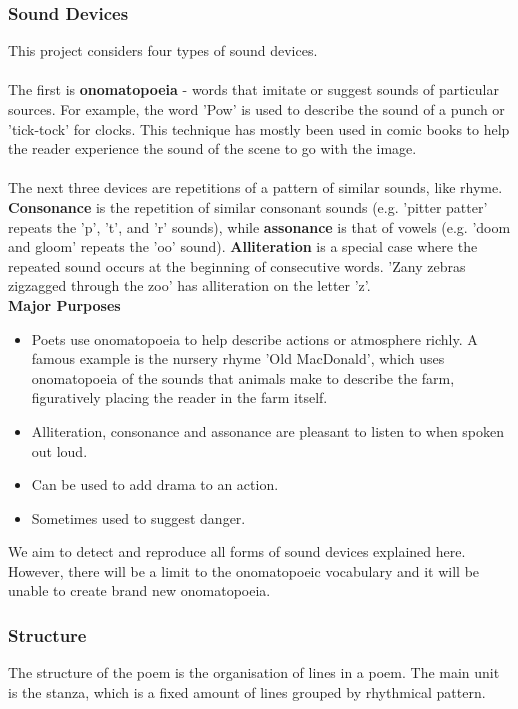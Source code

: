 \subsubsection{Sound Devices}
This project considers four types of sound devices.
\\\\
The first is \textbf{onomatopoeia} - words that imitate or suggest sounds of particular sources. For example, the word 'Pow' is used to describe the sound of a punch or 'tick-tock' for clocks. This technique has mostly been used in comic books to help the reader experience the sound of the scene to go with the image.
\\\\
The next three devices are repetitions of a pattern of similar sounds, like rhyme. \textbf{Consonance} is the repetition of similar consonant sounds (e.g. 'pitter patter' repeats the 'p', 't', and 'r' sounds), while \textbf{assonance} is that of vowels (e.g. 'doom and gloom' repeats the 'oo' sound). \textbf{Alliteration} is a special case where the repeated sound occurs at the beginning of consecutive words. 'Zany zebras zigzagged through the zoo' has alliteration on the letter 'z'.
\\
\textbf{Major Purposes}
\begin{itemize}
\item{Poets use onomatopoeia to help describe actions or atmosphere richly. A famous example is the nursery rhyme 'Old MacDonald', which uses onomatopoeia of the sounds that animals make to describe the farm, figuratively placing the reader in the farm itself.} 
\item{Alliteration, consonance and assonance are pleasant to listen to when spoken out loud.}
\item{Can be used to add drama to an action.}
\item{Sometimes used to suggest danger.}
\end{itemize}

We aim to detect and reproduce all forms of sound devices explained here. However, there will be a limit to the onomatopoeic vocabulary and it will be unable to create brand new onomatopoeia.

\subsubsection{Structure}
The structure of the poem is the organisation of lines in a poem. The main unit is the stanza, which is a fixed amount of lines grouped by rhythmical pattern.\\

